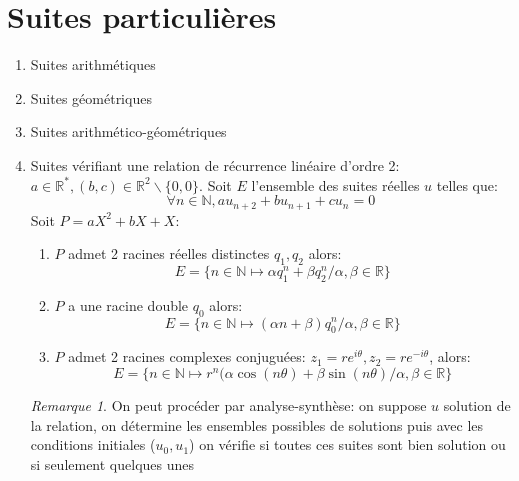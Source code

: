 \documentclass[fleqn]{article}
\theoremstyle{definition} \newtheorem*{defi}{D\'efinition}
\theoremstyle{definition} \newtheorem*{theo}{Th\'eor\`eme}
\theoremstyle{definition} \newtheorem*{prop}{Propri\'et\'e}
\theoremstyle{definition} \newtheorem*{coro}{Corollaire}
\theoremstyle{remark} \newtheorem*{rqs}{Remarque}
\begin{document}
\section{Suites particuli\`eres}
\begin{enumerate}
	\item Suites arithm\'etiques
	\item Suites g\'eom\'etriques
	\item Suites arithm\'etico-g\'eom\'etriques
	\item Suites v\'erifiant une relation de r\'ecurrence lin\'eaire d'ordre 2: \\
		$a \in \mathbb{R}^*, (b,c) \in \mathbb{R}^2\backslash\{0,0\}$. Soit $E$ l'ensemble des suites r\'eelles $u$ telles que:
		\[\forall n \in \mathbb{N}, au_{n+2} + bu_{n+1} + cu_n = 0\]
		Soit $P = aX^2 + bX + X$:
		\begin{enumerate}
			\item $P$ admet 2 racines r\'eelles distinctes $q_1, q_2$ alors:
				\[E = \{n \in \mathbb{N} \mapsto \alpha q_1^n + \beta q_2^n / \alpha, \beta \in \mathbb{R}\}\]
			\item $P$ a une racine double $q_0$ alors:
				\[E = \{n \in \mathbb{N} \mapsto (\alpha n + \beta) q_0^n / \alpha, \beta \in \mathbb{R}\}\]
			\item $P$ admet 2 racines complexes conjugu\'ees: $z_1 = re^{i\theta}, z_2 = re^{-i\theta}$, alors:
				\[E = \{n \in \mathbb{N} \mapsto r^n(\alpha \cos(n\theta) + \beta \sin(n\theta) / \alpha, \beta \in \mathbb{R}\}\]
		\end{enumerate}
		\begin{rqs}
			On peut proc\'eder par analyse-synth\`ese: on suppose $u$ solution de la relation, on d\'etermine les ensembles possibles de
			solutions puis avec les conditions initiales ($u_0, u_1$) on v\'erifie si toutes ces suites sont bien solution ou si seulement
			quelques unes
		\end{rqs}
\end{enumerate}
\end{document}
